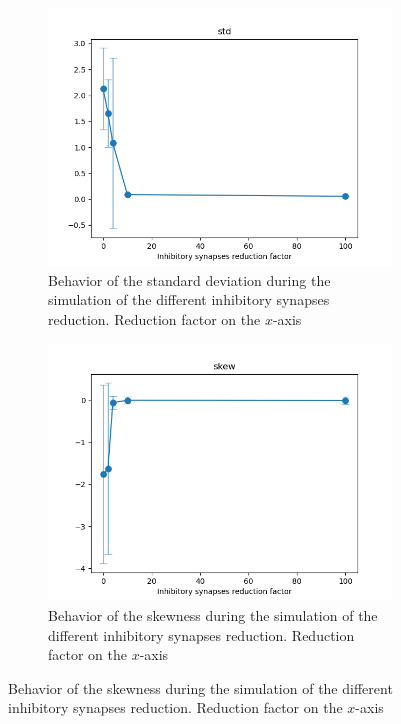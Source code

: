 \begin{figure}
  \begin{subfigure}[t]{0.48\textwidth}
    \centering
    \includegraphics[width=\textwidth]{std_evolution}
    \caption{Behavior of the standard deviation during the simulation of the different inhibitory synapses reduction. Reduction factor on the $x$-axis}
    \label{fig:std-evolution}
  \end{subfigure}
  \begin{subfigure}[t]{0.48\textwidth}
    \centering
    \includegraphics[width=\textwidth]{skew_evolution}
    \caption{Behavior of the skewness during the simulation of the different inhibitory synapses reduction. Reduction factor on the $x$-axis}
    \label{fig:skew-evolution}

\end{subfigure}
\end{figure}
